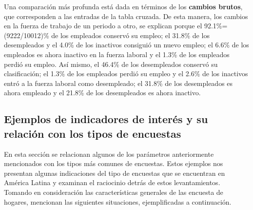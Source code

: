 \documentclass[12pt,spanish,]{book}
\begin{document}
Una comparación más profunda está dada en términos de los \textbf{cambios brutos}, que corresponden a las entradas de la tabla cruzada. De esta manera, los cambios en la fuerza de trabajo de un periodo a otro, se explican porque el 92.1\%=(9222/10012)\% de los empleados conservó su empleo; el 31.8\% de los desempleados y el 4.0\% de los inactivos consiguió un nuevo empleo; el 6.6\% de los empleados es ahora inactivo en la fuerza laboral y el 1.3\% de los empleados perdió su empleo. Así mismo, el 46.4\% de los desempleados conservó su clasificación; el 1.3\% de los empleados perdió su empleo y el 2.6\% de los inactivos entró a la fuerza laboral como desempleado; el 31.8\% de los desempleados es ahora empleado y el 21.8\% de los desempleados es ahora inactivo.

\hypertarget{ejemplos-de-indicadores-de-interes-y-su-relacion-con-los-tipos-de-encuestas}{%
\subsection{Ejemplos de indicadores de interés y su relación con los tipos de encuestas}\label{ejemplos-de-indicadores-de-interes-y-su-relacion-con-los-tipos-de-encuestas}}

En esta sección se relacionan algunos de los parámetros anteriormente mencionados con los tipos más comunes de encuestas. Estos ejemplos nos presentan algunas indicaciones del tipo de encuestas que se encuentran en América Latina y examinan el raciocinio detrás de estos levantamientos. Tomando en consideración las características generales de las encuesta de hogares, \textcite{Duncan_Kalton_1987} mencionan las siguientes situaciones, ejemplificadas a continuación.
\end{document}

